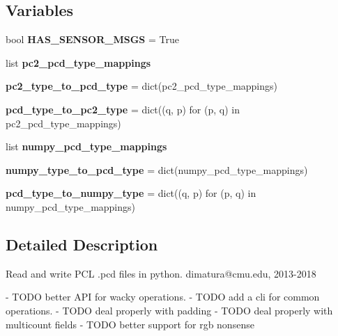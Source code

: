 \subsection*{Variables}
\begin{DoxyCompactItemize}
\item 
\mbox{\label{namespacepypcd__hack_1_1pypcd_ae069cc239c58be6f0f703d99943d671c}} 
bool {\bfseries H\+A\+S\+\_\+\+S\+E\+N\+S\+O\+R\+\_\+\+M\+S\+GS} = True
\item 
list {\bfseries pc2\+\_\+pcd\+\_\+type\+\_\+mappings}
\item 
\mbox{\label{namespacepypcd__hack_1_1pypcd_a06b5f045a34857f1dab674bd7ca3b203}} 
{\bfseries pc2\+\_\+type\+\_\+to\+\_\+pcd\+\_\+type} = dict(pc2\+\_\+pcd\+\_\+type\+\_\+mappings)
\item 
\mbox{\label{namespacepypcd__hack_1_1pypcd_a0d48404b714644ede55bf1307c6c2517}} 
{\bfseries pcd\+\_\+type\+\_\+to\+\_\+pc2\+\_\+type} = dict((q, p) for (p, q) in pc2\+\_\+pcd\+\_\+type\+\_\+mappings)
\item 
list {\bfseries numpy\+\_\+pcd\+\_\+type\+\_\+mappings}
\item 
\mbox{\label{namespacepypcd__hack_1_1pypcd_ab5a911a045b7b4a350809b919cf68651}} 
{\bfseries numpy\+\_\+type\+\_\+to\+\_\+pcd\+\_\+type} = dict(numpy\+\_\+pcd\+\_\+type\+\_\+mappings)
\item 
\mbox{\label{namespacepypcd__hack_1_1pypcd_a8b4e0e06abed851603a2061e1927e93b}} 
{\bfseries pcd\+\_\+type\+\_\+to\+\_\+numpy\+\_\+type} = dict((q, p) for (p, q) in numpy\+\_\+pcd\+\_\+type\+\_\+mappings)
\end{DoxyCompactItemize}


\subsection{Detailed Description}
\begin{DoxyVerb}Read and write PCL .pcd files in python.
dimatura@cmu.edu, 2013-2018

- TODO better API for wacky operations.
- TODO add a cli for common operations.
- TODO deal properly with padding
- TODO deal properly with multicount fields
- TODO better support for rgb nonsense
\end{DoxyVerb}
 

